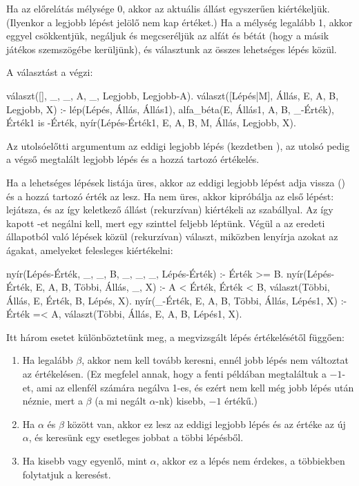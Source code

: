 Ha az előrelátás mélysége 0, akkor az aktuális
állást egyszerűen kiértékeljük. (Ilyenkor a legjobb
lépést jelölő  nem kap értéket.) Ha a
mélység legalább 1, akkor eggyel csökkentjük,
negáljuk és megcseréljük az alfát és bétát (hogy a
másik játékos szemszögébe kerüljünk), és választunk
az összes lehetséges lépés közül.

A választást a  végzi:
\begin{program}
választ([], _, _, A, _, Legjobb, Legjobb-A).
választ([Lépés|M], Állás, E, A, B, Legjobb, X) :-
    lép(Lépés, Állás, Állás1),
    alfa_béta(E, Állás1, A, B, _-Érték),
    Érték1 is -Érték,
    nyír(Lépés-Érték1, E, A, B, M, Állás,
         Legjobb, X).
\end{program}

Az utolsóelőtti argumentum az eddigi legjobb lépés
(kezdetben ), az utolsó pedig a végső
megtalált legjobb lépés és a hozzá tartozó
értékelés.

Ha a lehetséges lépések listája üres, akkor az
eddigi legjobb lépést adja vissza () és
a hozzá tartozó érték az  lesz. Ha nem
üres, akkor kipróbálja az első lépést: lejátsza, és
az így keletkező állást (rekurzívan) kiértékeli az
 szabállyal. Az így kapott
-et negálni kell, mert egy szinttel
feljebb léptünk. Végül a  az eredeti
 állapotból való lépések közül
(rekurzívan) választ, miközben lenyírja azokat az
ágakat, amelyeket felesleges kiértékelni:
\begin{program}
nyír(Lépés-Érték, _, _, B, _, _, _, Lépés-Érték) :-
    Érték >= B.
nyír(Lépés-Érték, E, A, B, Többi, Állás, _, X) :-
    A < Érték, Érték < B,
    választ(Többi, Állás, E, Érték, B, Lépés, X).
nyír(_-Érték, E, A, B, Többi, Állás, Lépés1, X) :-
    Érték =< A,
    választ(Többi, Állás, E, A, B, Lépés1, X).
\end{program}

Itt három esetet különböztetünk meg, a megvizsgált
lépés értékelésétől függően:
\begin{enumerate}
\item Ha legalább $\beta$, akkor nem kell tovább
  keresni, ennél jobb lépés nem változtat az
  értékelésen. (Ez megfelel annak, hogy a fenti
  példában megtaláltuk a $-1$-et, ami az ellenfél
  számára negálva 1-es, és ezért nem kell még jobb
  lépés után néznie, mert a $\beta$ (a mi negált
  $\alpha$-nk) kisebb, $-1$ értékű.)
\item Ha $\alpha$ és $\beta$ között van, akkor ez
  lesz az eddigi legjobb lépés és az értéke az új
  $\alpha$, és keresünk egy esetleges jobbat a többi
  lépésből.
\item Ha kisebb vagy egyenlő, mint $\alpha$, akkor
  ez a lépés nem érdekes, a többiekben folytatjuk a
  keresést.
\end{enumerate}

